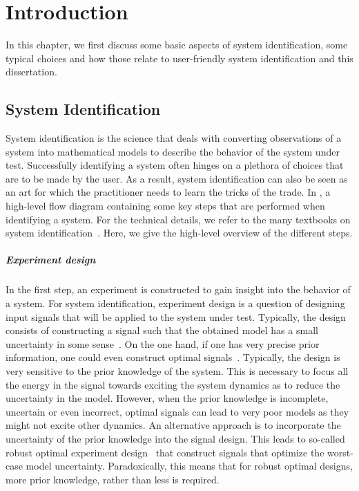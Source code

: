 \chapter{Introduction}
\def\thisDir{ch01-intro}

In this chapter, we first discuss some basic aspects of system identification, some typical choices and how those relate to user-friendly system identification and this dissertation.

\section{System Identification}
System identification is the science that deals with converting observations of a system into mathematical models to describe the behavior of the system under test.
Successfully identifying a system often hinges on a plethora of choices that are to be made by the user.
As a result, system identification can also be seen as an art for which the practitioner needs to learn the tricks of the trade.
In , a high-level flow diagram containing some key steps that are performed when identifying a system.
For the technical details, we refer to the many textbooks on system identification~\citep{Soderstrom1989,Ljung1999,Pintelon2012}.
Here, we give the high-level overview of the different steps.

\paragraph{Experiment design}
In the first step, an experiment is constructed to gain insight into the behavior of a system.
For system identification, experiment design is a question of designing input signals that will be applied to the system under test.
Typically, the design consists of constructing a signal such that the obtained model  has a small uncertainty in some sense~\citep{Goodwin1977,Goodwin2006GBO}.
On the one hand, if one has very precise prior information, one could even construct optimal signals~\citep{Gevers2011ExpDesign}.
Typically, the design is very sensitive to the prior knowledge of the system.
This is necessary to focus all the energy in the signal towards exciting the system dynamics as to reduce the uncertainty in the model.
However, when the prior knowledge is incomplete, uncertain or even incorrect, optimal signals can lead to very poor models as they might not excite other dynamics.
An alternative approach is to incorporate the uncertainty of the prior knowledge into the signal design.
This leads to so-called robust optimal experiment design~\citep{Rojas2012,Goodwin2006} that construct signals that optimize the worst-case model uncertainty.
Paradoxically, this means that for robust optimal designs, more prior knowledge, rather than less is required.

